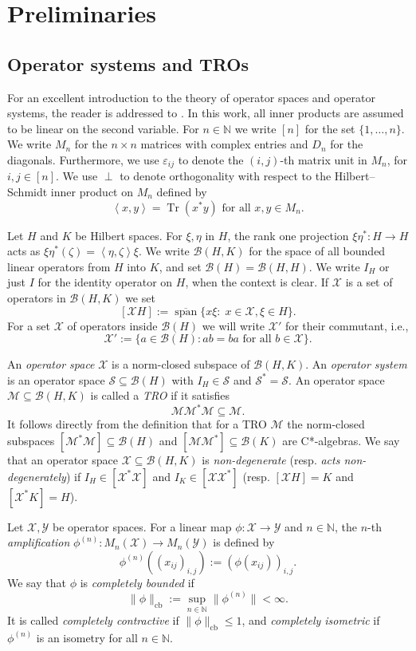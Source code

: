 \documentclass[11pt]{amsart}
\numberwithin{equation}{section}
\theoremstyle{plain}
\theoremstyle{definition}
\theoremstyle{remark}
\newcommand{\B}{{\mathcal{B}}}
\newcommand{\M}{{\mathcal{M}}}
\renewcommand{\S}{{\mathcal{S}}}
\newcommand{\X}{{\mathcal{X}}}
\newcommand{\Y}{{\mathcal{Y}}}
\newcommand{\eps}{\varepsilon}
\def\ze{\zeta}
\newcommand{\bN}{\mathbb{N}}
\newcommand{\foral}{\text{ for all }}
\newcommand{\ol}{\overline}
\newcommand{\spn}{\operatorname{span}}
\newcommand{\sca}[1]{\left\langle#1\right\rangle} %
\begin{document}
\section{Preliminaries} \label{sec:prelim}

\subsection{Operator systems and TROs} 
For an excellent introduction to the theory of operator spaces and operator systems, the reader is addressed to \cite{BL04, Pau02}.
In this work, all inner products are assumed to be linear on the second variable. For $n \in \bN$ we write $[n]$ for the set $\{1,\dots,n\}$. We write $M_{n}$ for the $n\times n$ matrices with complex entries and $D_n$ for the diagonals. Furthermore, we use $\eps_{ij}$ to denote the $(i, j)$-th matrix unit in $M_{n}$, for $i, j \in [n]$. We use $\perp$ to denote orthogonality with respect to the Hilbert--Schmidt inner product on $M_n$  defined by
\[
\sca{x, y} = \operatorname{Tr}(x^* y)  \foral x,y \in M_n.
\]

Let $H$ and $K$ be  Hilbert spaces.
For $\xi,\eta$ in $H$, the rank one projection $ \xi\eta^*\colon H \to H$ acts as $ \xi\eta^*(\ze)=\sca{\eta, \ze} \xi$. We write $\B(H, K)$ for the space of all bounded linear operators from $H$ into $K$, and set $\B(H) = \B(H, H)$. We write $I_{H}$ or just $I$ for the identity operator on $H$, when the context is clear. If $\X$ is a set of operators in $\B(H,K)$ we set 
\[
[\X H]:= \ol{\spn}\{x\xi: \; x \in \X, \xi \in H\}.
\]
For a set $\X$ of operators inside $\B(H)$ we will write $\X'$ for their commutant, i.e.,
\[
\X':=\{ a\in \B(H) : a b=ba \foral b \in \X\}.
\]

An \textit{operator space} $\X$ is a norm-closed subspace of $\B(H, K)$. An \textit{operator system} is an operator space $\S \subseteq \B(H)$ with $I_{H} \in \S$ and $\S^{*} = \S$.
An operator space $\M\subseteq \B(H,K)$ is called a \emph{TRO} if it satisfies 
\[
\M\M^*\M\subseteq \M.
\]
It follows directly from the definition that for a TRO $\M$ the norm-closed subspaces $[\M^*\M]\subseteq \B(H)$ and $[\M \M^*] \subseteq \B(K)$ are C*-algebras. We say that  an operator space $\X \subseteq \B(H,K)$ is  \emph{non-degenerate} (resp. \emph{acts non-degenerately}) if $I_H\in [\X^*\X] $ and $I_K\in [\X\X^*] $ (resp. $[\X H]=K$ and $ [\X^*K]=H$).

Let $\X, \Y$ be operator spaces. For a linear map $\phi \colon \X \to \Y$ and $n \in \bN$, the $n$-th \textit{amplification} $\phi^{(n)} \colon M_n(\X) \to M_n(\Y)$ is defined by
\[
\phi^{(n)}((x_{ij})_{i,j}) := (\phi(x_{ij}))_{i,j}.
\]
We say that $\phi$ is \textit{completely bounded} if
\[
\|\phi\|_{\mathrm{cb}} := \sup_{n \in \mathbb{N}} \|\phi^{(n)}\| < \infty.
\]
It is called \textit{completely contractive} if $\|\phi\|_{\mathrm{cb}} \leq 1$, and \textit{completely isometric} if $\phi^{(n)}$ is an isometry for all $n \in \mathbb{N}$.
\end{document}

